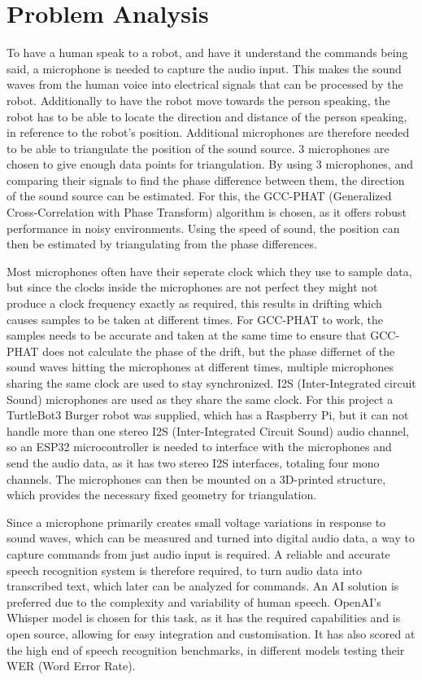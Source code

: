 \section{Problem Analysis}
To have a human speak to a robot, and have it understand the commands being said, a microphone is needed to capture the audio input. This makes the sound waves from the human voice into electrical signals that can be processed by the robot. Additionally to have the robot move towards the person speaking, the robot has to be able to locate the direction and distance of the person speaking, in reference to the robot's position. Additional microphones are therefore needed to be able to triangulate the position of the sound source. 3 microphones are chosen to give enough data points for triangulation. By using 3 microphones, and comparing their signals to find the phase difference between them, the direction of the sound source can be estimated. For this, the GCC-PHAT (Generalized Cross-Correlation with Phase Transform) algorithm is chosen, as it offers robust performance in noisy environments. Using the speed of sound, the position can then be estimated by triangulating from the phase differences.

Most microphones often have their seperate clock which they use to sample data, but since the clocks inside the microphones are not perfect they might not produce a clock frequency exactly as required, this results in drifting which causes samples to be taken at different times. For GCC-PHAT to work, the samples needs to be accurate and taken at the same time to ensure that GCC-PHAT does not calculate the phase of the drift, but the phase differnet of the sound waves hitting the microphones at different times, multiple microphones sharing the same clock are used to stay synchronized. I2S (Inter-Integrated circuit Sound) microphones are used as they share the same clock.
For this project a TurtleBot3 Burger robot was supplied, which has a Raspberry Pi, but it can not handle more than one stereo I2S (Inter-Integrated Circuit Sound) audio channel, so an ESP32 microcontroller is needed to interface with the microphones and send the audio data, as it has two stereo I2S interfaces, totaling four mono channels. The microphones can then be mounted on a 3D-printed structure, which provides the necessary fixed geometry for triangulation.


Since a microphone primarily creates small voltage variations in response to sound waves, which can be measured and turned into digital audio data, a way to capture commands from just audio input is required. A reliable and accurate speech recognition system is therefore required, to turn audio data into transcribed text, which later can be analyzed for commands. An AI solution is preferred due to the complexity and variability of human speech. OpenAI's Whisper model is chosen for this task, as it has the required capabilities and is open source, allowing for easy integration and customisation. It has also scored at the high end of speech recognition benchmarks, in different models testing their WER (Word Error Rate).


